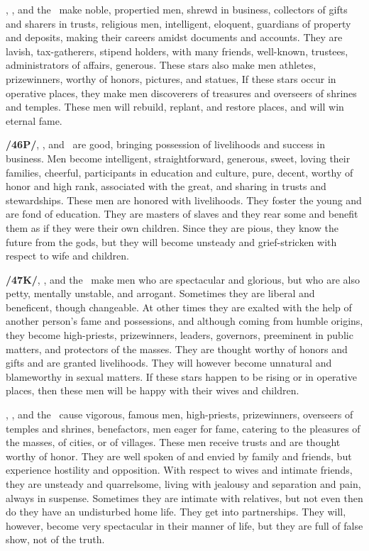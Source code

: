 \Jupiter, \Mercury, and the \Moon\, make noble, propertied men, shrewd in business, collectors of gifts
and sharers in trusts, religious men, intelligent, eloquent, guardians of property and deposits, making their careers amidst documents and accounts. They are lavish, tax-gatherers, stipend holders, with many friends, well-known, trustees, administrators of affairs, generous. These stars also make men athletes, prizewinners, worthy of honors, pictures, and statues, If these stars occur in operative places, they make men discoverers of treasures and overseers of shrines and temples. These men will rebuild, replant, and restore places, and will win eternal fame.

\textbf{/46P/}\Jupiter, \Mercury, and \Venus\, are good, bringing possession of livelihoods and success in business. Men become intelligent, straightforward, generous, sweet, loving their families, cheerful, participants in education and culture, pure, decent, worthy of honor and high rank, associated with the great, and sharing in trusts and stewardships. These men are honored with livelihoods. They foster the young and are fond of education. They are masters of slaves and they rear some and benefit them as if they
were their own children. Since they are pious, they know the future from the gods, but they will become unsteady and grief-stricken with respect to wife and children.

\textbf{/47K/}\Jupiter, \Venus, and the \Sun\, make men who are spectacular and glorious, but who are also petty,
mentally unstable, and arrogant. Sometimes they are liberal and beneficent, though changeable. At other times they are exalted with the help of another person’s fame and possessions, and although coming from humble origins, they become high-priests, prizewinners, leaders, governors, preeminent in public matters, and protectors of the masses. They are thought worthy of honors and gifts and are granted livelihoods. They will however become unnatural and blameworthy in sexual matters. If these stars happen to be rising or in operative places, then these men will be happy with their wives and children.

\Jupiter, \Venus, and the \Moon\, cause vigorous, famous men, high-priests, prizewinners, overseers of temples and shrines, benefactors, men eager for fame, catering to the pleasures of the masses, of cities, or of villages. These men receive trusts and are thought worthy of honor. They are well spoken of and envied by family and friends, but experience hostility and opposition. With respect to wives and intimate friends, they are unsteady and quarrelsome, living with jealousy and separation and pain, always in suspense. Sometimes they are intimate with relatives, but not even then do they have an undisturbed home life. They get into partnerships. They will, however, become very spectacular in their manner of life, but they are full of false show, not of the truth.

